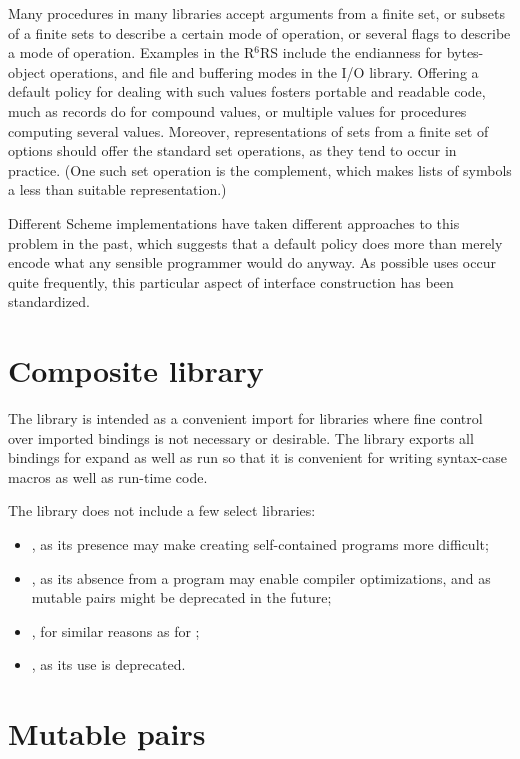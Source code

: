 \documentclass[twoside,twocolumn]{algol60}
\newcommand{\rn}[1]{R$^{#1}$RS}
\begin{document}
Many procedures in many libraries accept arguments from a finite set,
or subsets of a finite sets to describe a certain mode of operation,
or several flags to describe a mode of operation.  Examples in the
\rn{6} include the endianness for bytes-object operations, and file
and buffering modes in the I/O library.  Offering a default policy for
dealing with such values fosters portable and readable code, much as
records do for compound values, or multiple values for procedures
computing several values.  Moreover, representations of sets from a
finite set of options should offer the standard set operations, as
they tend to occur in practice.  (One such set operation is the
complement, which makes lists of symbols a less than suitable
representation.)

Different Scheme implementations have taken different approaches to
this problem in the past, which suggests that a default policy does
more than merely encode what any sensible programmer would do anyway.  As
possible uses occur quite frequently, this particular aspect of
interface construction has been standardized.


\chapter{Composite library}

The \thersixlibrary{} library is intended as a convenient import for
libraries where fine control over imported bindings is not necessary
or desirable. The \thersixlibrary{} library exports all bindings for
{\cf expand} as well as {\cf run} so that it is convenient for writing
{\cf syntax-case} macros as well as run-time code.

The \rsixlibrary{} library does not include a few select libraries:
%
\begin{itemize}
\item {}, as its presence may make creating
  self-contained programs more difficult;
\item {}, as its absence from a program may enable compiler
  optimizations, and as mutable pairs might be deprecated in the future;
\item {}, for similar reasons as for
  ;
\item {}, as its use is deprecated.
\end{itemize}

\chapter{Mutable pairs}
\end{document}

